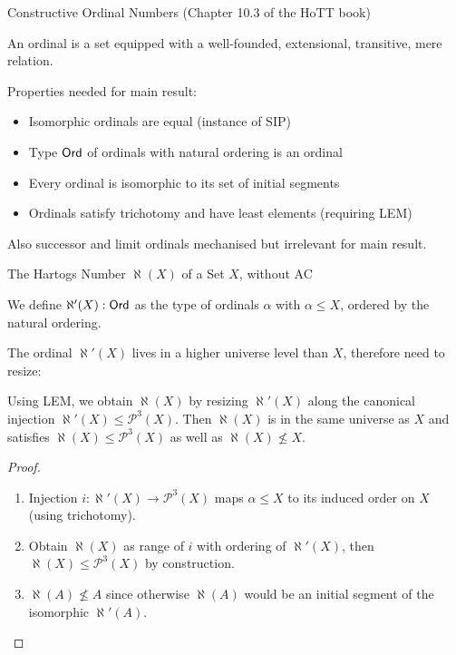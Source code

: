 \documentclass[xcolor=dvipsnames,compress,aspectratio=169,handout]{beamer}
\newcommand{\MCL}[1]{\ensuremath{\mathcal{#1}}\xspace} %
\newcommand{\Pow}{\MCL P}
\begin{document}
\begin{frame}{Constructive Ordinal Numbers (Chapter 10.3 of the HoTT book)}
	\begin{definition}
		An ordinal is a set equipped with a well-founded, extensional, transitive, mere relation.
	\end{definition}

	\pause
	\vspace{0.5cm}
	Properties needed for main result:
	\begin{itemize}
		\vspace{0.2cm}
		\item
		Isomorphic ordinals are equal (instance of SIP)
		\vspace{0.2cm}
		\item
		Type $\mathsf{Ord}$ of ordinals with natural ordering is an ordinal
		\vspace{0.2cm}
		\item
		Every ordinal is isomorphic to its set of initial segments
		\vspace{0.2cm}
		\item
		Ordinals satisfy trichotomy and have least elements (requiring LEM)
	\end{itemize}

	\pause
	\vspace{0.5cm}
	Also successor and limit ordinals mechanised but irrelevant for main result.
\end{frame}

\begin{frame}{The Hartogs Number $\aleph(X)$ of a Set $X$, without AC}
	\pause
	\begin{definition}
		We define $\aleph'(X):\mathsf{Ord}$ as the type of ordinals $\alpha$ with $\alpha \le X$, ordered by the natural ordering.
	\end{definition}

	\pause
	\vspace{0.3cm}
	The ordinal $\aleph'(X)$ lives in a higher universe level than $X$, therefore need to resize:
	\pause
	\begin{theorem}
		Using LEM, we obtain $\aleph(X)$ by resizing $\aleph'(X)$ along the canonical injection $\aleph'(X)\le\Pow^3(X)$.
		Then $\aleph(X)$ is in the same universe as $X$ and satisfies $\aleph(X)\le\Pow^3(X)$ as well as $\aleph(X)\not\le X$.
	\end{theorem}
	\pause
	\begin{proof}
		\begin{enumerate}
			\pause
			\item
			Injection $i: \aleph'(X)\to\Pow^3(X)$ maps $\alpha\le X$ to its induced order on $X$ (using trichotomy).
			\pause
			\item
			Obtain $\aleph(X)$ as range of $i$ with ordering of $\aleph'(X)$, then $\aleph(X)\le\Pow^3(X)$ by construction.
			\pause
			\item
			$\aleph(A)\not\le A$ since otherwise $\aleph(A)$ would be an initial segment of the isomorphic $\aleph'(A)$.
			\qedhere
		\end{enumerate}
	\end{proof}
\end{frame}
\end{document}
